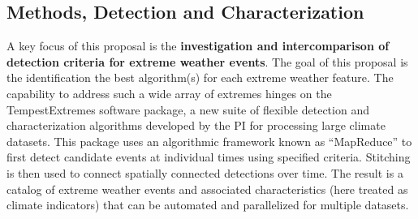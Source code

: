\documentclass[11pt]{article}
\begin{document}





\subsection{Methods, Detection and Characterization} \label{sec:Methods}

A key focus of this proposal is the \textbf{investigation and intercomparison of detection criteria for extreme weather events}.  The goal of this proposal is the identification the best algorithm(s) for each extreme weather feature.  The capability to address such a wide array of extremes hinges on the TempestExtremes software package, a new suite of flexible detection and characterization algorithms developed by the PI for processing large climate datasets. This package uses an algorithmic framework known as ``MapReduce'' to first detect candidate events at individual times using specified criteria. Stitching is then used to connect spatially connected detections over time. The result is a catalog of extreme weather events and associated characteristics (here treated as climate indicators) that can be automated and parallelized for multiple datasets.
\end{document}
